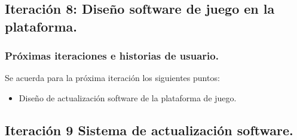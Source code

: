 \subsection{Iteración 8: Diseño software de juego en la plataforma.}
\subsubsection{Próximas iteraciones e historias de usuario.}
Se acuerda para la próxima iteración los siguientes puntos:
\begin{itemize}
\item Diseño de actualización software de la plataforma de juego.
\end{itemize}
\subsection{Iteración 9 Sistema de actualización software.}
